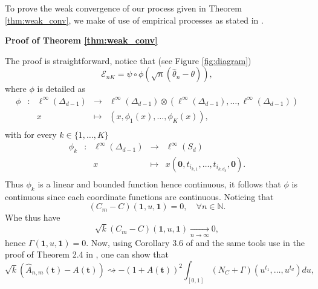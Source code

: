 \documentclass[11pt]{article}
\makeatletter
\theoremstyle{definition}
\renewenvironment{proof}[1][\proofname]{\par
\pushQED{\qed}%
\normalfont \topsep6\p@\@plus6\p@\relax
\trivlist
\item\relax
{\textbf{
#1\@addpunct{ }}}\hspace\labelsep\ignorespaces
}{%
\popQED\endtrivlist\@endpefalse
}
\makeatother
\begin{document}
	To prove the weak convergence of our process given in Theorem \ref{thm:weak_conv}, we make of use of empirical processes as stated in \cite{bestbook}.
	
	\begin{proof}[Proof of Theorem \ref{thm:weak_conv}]
		The proof is straightforward, notice that (see Figure \ref{fig:diagram})
		\begin{equation*}
			\mathcal{E}_{nK} = \psi \circ \phi \left(\sqrt{n}(\hat{\theta}_n - \theta) \right),
		\end{equation*}
		where $\phi$ is detailed as
		\begin{equation*}
			\begin{array}{ccccc}
\phi & : & \ell^{\infty}(\Delta_{d-1}) & \to & \ell^{\infty}(\Delta_{d-1}) \otimes (\ell^{\infty}(\Delta_{d-1}), \dots, \ell^{\infty}(\Delta_{d-1})) \\
 & & x & \mapsto & (x, \phi_1(x), \dots, \phi_K(x)), \\
			\end{array}
		\end{equation*}
		with for every $k\in \{1,\dots,K\}$
		\begin{equation*}
			\begin{array}{ccccc}
\phi_k & : & \ell^{\infty}(\Delta_{d-1}) & \to & \ell^{\infty}(S_{d}) \\
 & & x & \mapsto & x(\textbf{0}, t_{i_{k,1}},\dots, t_{i_{k,d_k}}, \textbf{0}). \\
			\end{array}
		\end{equation*}
		Thus $\phi_k$ is a linear and bounded function hence continuous, it follows that $\phi$ is continuous  since each coordinate functions are continuous. Noticing that 
		\begin{equation*}
			(C_m - C)(\textbf{1},u,\textbf{1}) = 0, \quad \forall n \in \mathbb{N}.
		\end{equation*}
		Whe thus have
		\begin{equation*}
			\sqrt{k}(C_m-C)(\textbf{1},u,\textbf{1}) \underset{n \rightarrow \infty}{\longrightarrow} 0,
		\end{equation*}
		hence $\Gamma(\textbf{1},u,\textbf{1}) = 0$. Now, using Corollary 3.6 of \cite{bucher2014extreme} and the same tools use in the proof of Theorem 2.4 in \cite{MARCON20171}, one can show that
		\begin{equation*}		
		 \sqrt{k}(\hat{A}_{n,m}(\textbf{t}) - A(\textbf{t})) \rightsquigarrow -\left(1+A(\textbf{t})\right)^2 \int_{[0,1]}(N_C + \Gamma)(u^{t_1}, \dots, u^{t_d}) du,

\end{equation*}
\end{proof}
\end{document}
